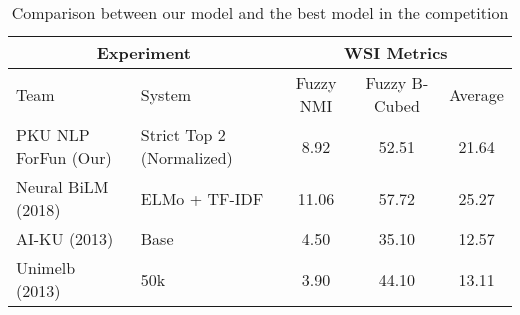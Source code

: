 \begin{table}[htbp!]
    \centering
    \begin{tabular}{llccc}
    \toprule
        \multicolumn{2}{c}{Experiment}                    & \multicolumn{3}{c}{WSI Metrics}           \\
    \midrule
        Team                    & System                     & Fuzzy NMI     & Fuzzy B-Cubed  & Average  \\
    \midrule
        PKU NLP ForFun (Our)    & Strict Top 2 (Normalized)  & 8.92          & 52.51          & 21.64    \\
        Neural BiLM (2018)      & ELMo + TF-IDF              & 11.06         & 57.72          & 25.27    \\
        AI-KU (2013)            & Base                       & 4.50          & 35.10          & 12.57    \\
        Unimelb (2013)          & 50k                        & 3.90          & 44.10          & 13.11    \\
    \bottomrule
    \end{tabular}
\caption{Comparison between our model and the best model in the competition}
\label{tab:best_result}
\end{table}